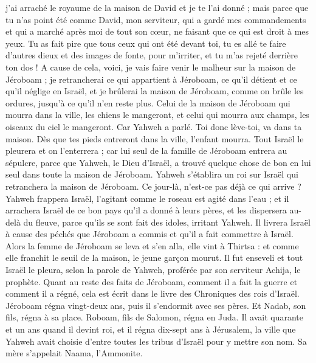 \begin{multicols}{2}
j'ai arraché le royaume de la maison de David et je te l'ai donné ; mais parce que tu n'as point été comme David, mon serviteur, qui a gardé mes commandements et qui a marché après moi de tout son cœur, ne faisant que ce qui est droit à mes yeux.
Tu as fait pire que tous ceux qui ont été devant toi, tu es allé te faire d'autres dieux et des images de fonte, pour m'irriter, et tu m'as rejeté derrière ton dos !
A cause de cela, voici, je vais faire venir le malheur sur la maison de Jéroboam ; je retrancherai ce qui appartient à Jéroboam, ce qu’il détient et ce qu’il néglige en Israël, et je brûlerai la maison de Jéroboam, comme on brûle les ordures, jusqu'à ce qu'il n'en reste plus.
Celui de la maison de Jéroboam qui mourra dans la ville, les chiens le mangeront, et celui qui mourra aux champs, les oiseaux du ciel le mangeront. Car Yahweh a parlé.
Toi donc lève-toi, va dans ta maison. Dès que tes pieds entreront dans la ville, l'enfant mourra.
Tout Israël le pleurera et on l’enterrera ; car lui seul de la famille de Jéroboam entrera au sépulcre, parce que Yahweh, le Dieu d'Israël, a trouvé quelque chose de bon en lui seul dans toute la maison de Jéroboam.
Yahweh s'établira un roi sur Israël qui retranchera la maison de Jéroboam. Ce jour-là, n’est-ce pas déjà ce qui arrive ?
Yahweh frappera Israël, l'agitant comme le roseau est agité dans l'eau ; et il arrachera Israël de ce bon pays qu'il a donné à leurs pères, et les dispersera au-delà du fleuve, parce qu'ils se sont fait des idoles, irritant Yahweh.
Il livrera Israël à cause des péchés que Jéroboam a commis et qu’il a fait commettre à Israël.
Alors la femme de Jéroboam se leva et s'en alla, elle vint à Thirtsa : et comme elle franchit le seuil de la maison, le jeune garçon mourut.
Il fut enseveli et tout Israël le pleura, selon la parole de Yahweh, proférée par son serviteur Achija, le prophète.
Quant au reste des faits de Jéroboam, comment il a fait la guerre et comment il a régné, cela est écrit dans le livre des Chroniques des rois d'Israël.
Jéroboam régna vingt-deux ans, puis il s'endormit avec ses pères. Et Nadab, son fils, régna à sa place.
Roboam, fils de Salomon, régna en Juda. Il avait quarante et un ans quand il devint roi, et il régna dix-sept ans à Jérusalem, la ville que Yahweh avait choisie d'entre toutes les tribus d'Israël pour y mettre son nom. Sa mère s’appelait Naama, l’Ammonite.

\end{multicols}
